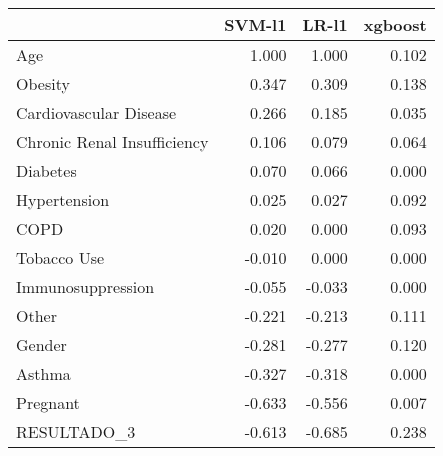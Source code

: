 \begin{tabular}{lrrr}
\toprule
{} &  SVM-l1 &  LR-l1 &  xgboost \\
\midrule
Age                         &   1.000 &  1.000 &    0.102 \\
Obesity                     &   0.347 &  0.309 &    0.138 \\
Cardiovascular Disease      &   0.266 &  0.185 &    0.035 \\
Chronic Renal Insufficiency &   0.106 &  0.079 &    0.064 \\
Diabetes                    &   0.070 &  0.066 &    0.000 \\
Hypertension                &   0.025 &  0.027 &    0.092 \\
COPD                        &   0.020 &  0.000 &    0.093 \\
Tobacco Use                 &  -0.010 &  0.000 &    0.000 \\
Immunosuppression           &  -0.055 & -0.033 &    0.000 \\
Other                       &  -0.221 & -0.213 &    0.111 \\
Gender                      &  -0.281 & -0.277 &    0.120 \\
Asthma                      &  -0.327 & -0.318 &    0.000 \\
Pregnant                    &  -0.633 & -0.556 &    0.007 \\
RESULTADO\_3                 &  -0.613 & -0.685 &    0.238 \\
\bottomrule
\end{tabular}
